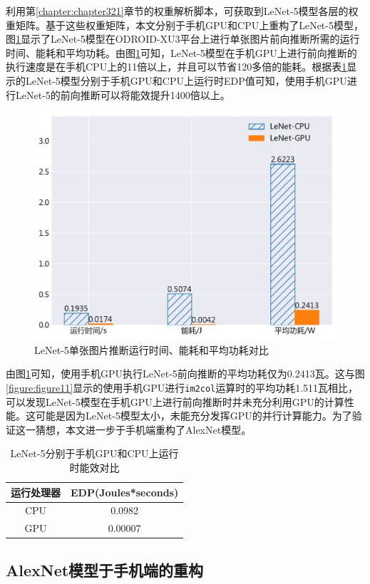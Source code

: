 利用第\ref{chapter:chapter321}章节的权重解析脚本，可获取到LeNet-5模型各层的权重矩阵。基于这些权重矩阵，本文分别于手机GPU和CPU上重构了LeNet-5模型，图\ref{figure:figure16}显示了LeNet-5模型在ODROID-XU3平台上进行单张图片前向推断所需的运行时间、能耗和平均功耗。由图\ref{figure:figure16}可知，LeNet-5模型在手机GPU上进行前向推断的执行速度是在手机CPU上的11倍以上，并且可以节省120多倍的能耗。根据表\ref{table:table6}显示的LeNet-5模型分别于手机GPU和CPU上运行时EDP值可知，使用手机GPU进行LeNet-5的前向推断可以将能效提升1400倍以上。

\begin{figure}[htbp]
    \centering
    \includegraphics[height=0.4\textwidth]{figures/lenet_energy.pdf}
    \caption{LeNet-5单张图片推断运行时间、能耗和平均功耗对比}\label{figure:figure16}
\end{figure}

由图\ref{figure:figure16}可知，使用手机GPU执行LeNet-5前向推断的平均功耗仅为0.2413瓦。这与图\ref{figure:figure11}显示的使用手机GPU进行\texttt{im2col}运算时的平均功耗1.511瓦相比，可以发现LeNet-5模型在手机GPU上进行前向推断时并未充分利用GPU的计算性能。这可能是因为LeNet-5模型太小，未能充分发挥GPU的并行计算能力。为了验证这一猜想，本文进一步于手机端重构了AlexNet模型。

\begin{table}[htbp]
  \centering
  \caption{LeNet-5分别于手机GPU和CPU上运行时能效对比}
  \label{table:table6}
  \begin{tabular}{cc}
    \toprule
      运行处理器 & EDP(Joules*seconds) \\
    \midrule
      CPU & 0.0982 \\
      GPU & 0.00007 \\
    \bottomrule
  \end{tabular}
\end{table}

\subsection{AlexNet模型于手机端的重构}

